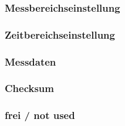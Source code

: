 \subsubsection{Messbereichseinstellung}
\subsubsection{Zeitbereichseinstellung}
\subsubsection{Messdaten}
\subsubsection{Checksum}
\subsubsection{frei / not used}
